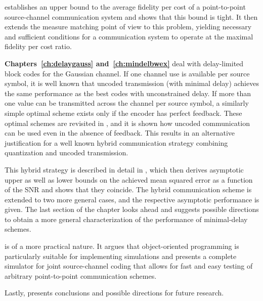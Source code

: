  establishes an upper bound to the average fidelity per cost
of a point-to-point source-channel communication system and shows that this
bound is tight. It then extends the measure matching point of view to this
problem, yielding necessary and sufficient conditions for a communication system
to operate at the maximal fidelity per cost ratio. 

\textbf{Chapters~\ref{ch:delaygauss} and~\ref{ch:mindelbwex}} deal with
delay-limited block codes for the Gaussian channel.  If one channel use is
available per source symbol, it is well known that uncoded transmission (with
minimal delay) achieves the same performance as the best codes with
unconstrained delay. If more than one value can be transmitted across the
channel per source symbol, a similarly simple optimal scheme exists only if the
encoder has perfect feedback.  These optimal schemes are revisited in
, and it is shown how uncoded communication can be used
even in the absence of feedback. This results in an alternative justification
for a well known hybrid communication strategy combining quantization and
uncoded transmission.

This hybrid strategy is described in detail in , which
then derives asymptotic upper as well as lower bounds on the achieved mean
squared error as a function of the SNR and shows that they coincide. The hybrid
communication scheme is extended to two more general cases, and the respective
asymptotic performance is given. The last section of the chapter looks ahead and
suggests possible directions to obtain a more general characterization of the
performance of minimal-delay schemes. 

 is of a more practical nature. It argues that
object-oriented programming is particularly suitable for implementing
simulations and presents a complete simulator for joint source-channel coding
that allows for fast and easy testing of arbitrary point-to-point communication
schemes. 

Lastly,  presents conclusions and possible directions for
future research.

